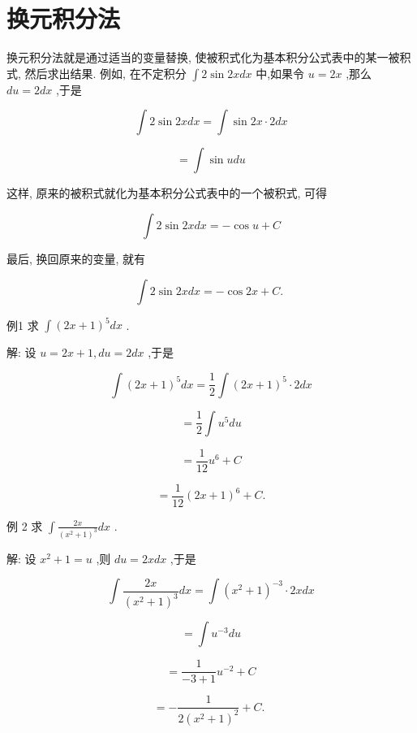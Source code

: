 \documentclass[lang=cn,newtx,12pt,scheme=chinese]{elegantbook}
\begin{document}
\section{换元积分法}

换元积分法就是通过适当的变量替换, 使被积式化为基本积分公式表中的某一被积式, 然后求出结果. 例如, 在不定积分 \(\int 2\sin {2xdx}\) 中,如果令 \(u = {2x}\) ,那么 \({du} = {2dx}\) ,于是

\[
\int 2\sin {2xdx} = \int \sin {2x} \cdot {2dx}
\]

\[
= \int \sin {udu}
\]

这样, 原来的被积式就化为基本积分公式表中的一个被积式, 可得

\[
\int 2\sin {2xdx} = - \cos u + C
\]

最后, 换回原来的变量, 就有

\[
\int 2\sin {2xdx} = - \cos {2x} + C\text{. }
\]

例1 求 \(\int {\left( 2x + 1\right) }^{5}{dx}\) .

解: 设 \(u = {2x} + 1,{du} = {2dx}\) ,于是

\[
\int {\left( 2x + 1\right) }^{5}{dx} = \frac{1}{2}\int {\left( 2x + 1\right) }^{5} \cdot {2dx}
\]

\[
= \frac{1}{2}\int {u}^{5}{du}
\]

\[
= \frac{1}{12}{u}^{6} + C
\]

\[
= \frac{1}{12}{\left( 2x + 1\right) }^{6} + C\text{.}
\]

例 2 求 \(\int \frac{2x}{{\left( {x}^{2} + 1\right) }^{3}}{dx}\) .

解: 设 \({x}^{2} + 1 = u\) ,则 \({du} = {2xdx}\) ,于是

\[
\int \frac{2x}{{\left( {x}^{2} + 1\right) }^{3}}{dx} = \int {\left( {x}^{2} + 1\right) }^{-3} \cdot {2xdx}
\]

\[
= \int {u}^{-3}{du}
\]

\[
= \frac{1}{-3 + 1}{u}^{-2} + C
\]

\[
= - \frac{1}{2{\left( {x}^{2} + 1\right) }^{2}} + C\text{. }
\]
\end{document}

